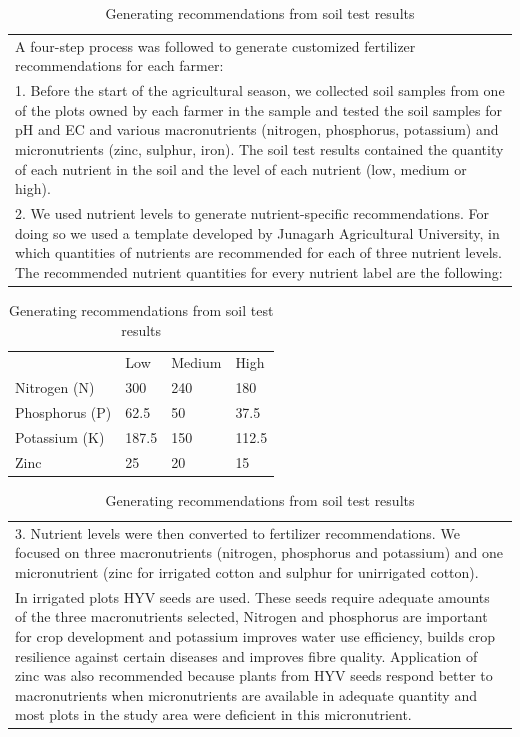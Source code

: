 \documentclass{article}
\begin{document}
\begin{table}[!htb] \centering \caption{Generating recommendations from soil test results} \label{t:fertilizer-recommendation-methodology}
\begin{tabularx}{\linewidth}{X}
\hline \hline 
A four-step process was followed to generate customized fertilizer recommendations for each farmer: \\
1. Before the start of the agricultural season, we collected soil samples from one of the plots owned by each farmer in the sample and tested the soil samples for pH and EC and various macronutrients (nitrogen, phosphorus, potassium) and micronutrients (zinc, sulphur, iron). The soil test results contained the quantity of each nutrient in the soil and the level of each nutrient (low, medium or high).\\
2. We used nutrient levels to generate nutrient-specific recommendations. For doing so we used a template developed by Junagarh Agricultural University, in which quantities of nutrients are recommended for each of three nutrient levels. The recommended nutrient quantities for every nutrient label are the following: \\ \hline
\end{tabularx}
\begin{tabularx}{0.5\linewidth}{lXXX}
 & Low & Medium & High \\ 
Nitrogen (N) & 300 & 240 & 180 \\
Phosphorus (P) & 62.5 & 50 & 37.5 \\
Potassium (K) & 187.5 & 150 & 112.5 \\
Zinc & 25 & 20 & 15 \\
\end{tabularx}
\begin{tabularx}{\linewidth}{X}
\hline 
3. Nutrient levels were then converted to fertilizer recommendations. We focused on three macronutrients (nitrogen, phosphorus and potassium) and one micronutrient (zinc for irrigated cotton and sulphur for unirrigated cotton). \\
In irrigated plots HYV seeds are used. These seeds require adequate amounts of the three macronutrients selected, Nitrogen and phosphorus are important for crop development and potassium improves water use efficiency, builds crop resilience against certain diseases and improves fibre quality. Application of zinc was also recommended because plants from HYV seeds respond better to macronutrients when micronutrients are available in adequate quantity and most plots in the study area were deficient in this micronutrient. \\

\end{tabularx}
\end{table}
\end{document}
